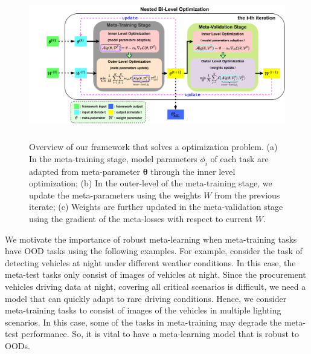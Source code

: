 \begin{figure}[!htbp]
    \centering
    \includegraphics[width=0.85\linewidth, height=6.5cm]{figs/overview.pdf}
    \caption{Overview of our \sysname{} framework that solves a \textit{\biopt{}} optimization problem. (a) In the meta-training stage, model parameters $\phi_i$ of each task are adapted from meta-parameter $\boldsymbol{\theta}$ through the inner level optimization; (b) In the outer-level of the meta-training stage, we update the meta-parameters using the weights $W$ from the previous iterate; (c) Weights are further updated in the meta-validation stage using the gradient of the meta-losses with respect to current $W$.} 
    \label{fig:overview}
    \vspace{-4mm}
\end{figure}

We motivate the importance of robust meta-learning when meta-training tasks have OOD tasks using the following examples. For example, consider the task of detecting vehicles at night under different weather conditions. In this case, the meta-test tasks only consist of images of vehicles at night. Since the procurement vehicles driving data at night, covering all critical scenarios is difficult, we need a model that can quickly adapt to rare driving conditions. Hence, we consider meta-training tasks to consist of images of the vehicles in multiple lighting scenarios. In this case, some of the tasks in meta-training may degrade the meta-test performance. So, it is vital to have a meta-learning model that is robust to OODs.

